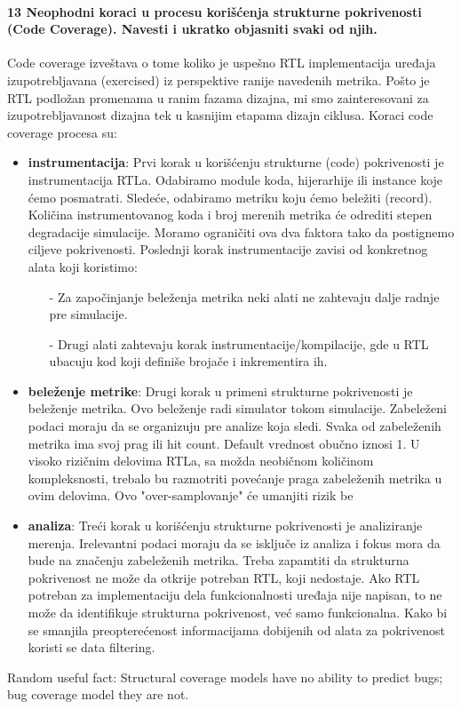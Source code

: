 \documentclass[a4paper, 12pt]{article}
\begin{document}
\paragraph{13 Neophodni koraci u procesu korišćenja strukturne pokrivenosti (Code Coverage). Navesti i ukratko objasniti svaki od njih.}
\hfill \break
\indent Code coverage izveštava o tome koliko je uspešno RTL implementacija uređaja izupotrebljavana (exercised) iz perspektive ranije navedenih metrika. Pošto je RTL podložan promenama u ranim fazama dizajna, mi smo zainteresovani za izupotrebljavanost dizajna tek u kasnijim etapama dizajn ciklusa. Koraci code coverage procesa su:
\begin{itemize}
\item \textbf{instrumentacija}: Prvi korak u korišćenju strukturne (code) pokrivenosti je instrumentacija RTLa. Odabiramo module koda, hijerarhije ili instance koje ćemo posmatrati. Sledeće, odabiramo metriku koju ćemo beležiti (record). Količina instrumentovanog koda i broj merenih metrika će odrediti stepen degradacije simulacije. Moramo ograničiti ova dva faktora tako da postignemo ciljeve pokrivenosti. Poslednji korak instrumentacije zavisi od konkretnog alata koji koristimo:
\begin{itemize}
\item[-] Za započinjanje beleženja metrika neki alati ne zahtevaju dalje radnje pre simulacije.
\item[-] Drugi alati zahtevaju korak instrumentacije/kompilacije, gde u RTL ubacuju kod koji definiše brojače i inkrementira ih.
\end{itemize}
\item \textbf{beleženje metrike}: Drugi korak u primeni strukturne pokrivenosti je beleženje metrika. Ovo beleženje radi simulator tokom simulacije. Zabeleženi podaci moraju da se organizuju pre analize koja sledi. Svaka od zabeleženih metrika ima svoj prag ili hit count. Default vrednost obučno iznosi 1. U visoko rizičnim delovima RTLa, sa možda neobičnom količinom kompleksnosti, trebalo bu razmotriti povećanje praga zabeleženih metrika u ovim delovima. Ovo "over-samplovanje" će umanjiti rizik be
\item \textbf{analiza}: Treći korak u korišćenju strukturne pokrivenosti je analiziranje merenja. Irelevantni podaci moraju da se isključe iz analiza i fokus mora da bude na značenju zabeleženih metrika. Treba zapamtiti da strukturna pokrivenost ne može da otkrije potreban RTL, koji nedostaje. Ako RTL potreban za implementaciju dela funkcionalnosti uređaja nije napisan, to ne može da identifikuje strukturna pokrivenost, već samo funkcionalna. Kako bi se smanjila preopterećenost informacijama dobijenih od alata za pokrivenost koristi se data filtering.
\end{itemize}
\indent *Random useful fact: Structural coverage models have no ability to predict bugs; bug coverage model they are not.
\end{document}

